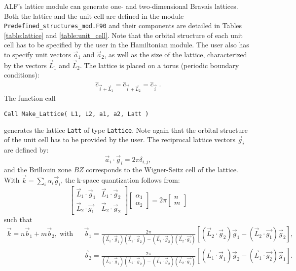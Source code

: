 ALF's lattice module can generate one- and two-dimensional Bravais lattices.
Both the lattice and the unit cell are defined in the module \texttt{Predefined\_structures\_mod.F90} and their components are detailed in Tables \ref{table:lattice} and \ref{table:unit_cell}.
Note that the orbital structure of each unit cell has to be specified by the user in the Hamiltonian module. 
The user also has to specify unit vectors $\vec{a}_1$ and $\vec{a}_2$, as well as the size of the  lattice, characterized by the vectors $\vec{L}_1$ and $\vec{L}_2$. The lattice is placed on a torus (periodic boundary conditions):
\begin{align}
	\hat{c}_{\vec{i} + \vec{L}_1 }  = \hat{c}_{\vec{i} + \vec{L}_2 }  = \hat{c}_{\vec{i}}\;.
\end{align}
The function call 
\lstset{style=fortran}
\begin{lstlisting} 
Call Make_Lattice( L1, L2, a1, a2, Latt )
\end{lstlisting}
generates the lattice \texttt{Latt} of type \texttt{Lattice}.   Note again that  the orbital structure of the unit cell has to be provided by the user.    The reciprocal lattice vectors $\vec{g}_i$ are defined by: 
\begin{equation}
\label{Latt.G.eq}
	\vec{a}_i  \cdot \vec{g}_i = 2 \pi \delta_{i,j}, 
\end{equation}
and the Brillouin zone $BZ$ corresponds to the Wigner-Seitz cell of the lattice. 
With $\vec{k} = \sum_{i} \alpha_i  \vec{g}_i $, the  k-space quantization follows from: 
\begin{equation}
\begin{bmatrix}
	\vec{L}_1 \cdot \vec{g}_1  &  \vec{L}_1 \cdot \vec{g}_2  \\
	\vec{L}_2  \cdot \vec{g_1} & \vec{L}_2 \cdot  \vec{g}_2  
\end{bmatrix}
\begin{bmatrix}
   \alpha_1 \\
   \alpha_2
\end{bmatrix}
=  2 \pi 
\begin{bmatrix}
   n \\
   m
\end{bmatrix}
\end{equation}
such that 
\begin{eqnarray}
\label{k.quant.eq}
     \vec{k} =  n \vec{b}_1  + m \vec{b}_2,\; \text{with}   & &   \vec{b}_1 = \frac{2 \pi}{ (\vec{L}_1 \cdot \vec{g}_1)  (\vec{L}_2 \cdot  \vec{g}_2 )  - (\vec{L}_1 \cdot \vec{g}_2) (\vec{L}_2  \cdot \vec{g_1} ) }   \left[  (\vec{L}_2 \cdot  \vec{g}_2) \vec{g}_1 -   (\vec{L}_2  \cdot \vec{g_1} ) \vec{g}_2 \right], \nonumber \\ 
        & & \vec{b}_2 = \frac{2 \pi}{ (\vec{L}_1 \cdot \vec{g}_1)  (\vec{L}_2 \cdot  \vec{g}_2 )  - (\vec{L}_1 \cdot \vec{g}_2) (\vec{L}_2  \cdot \vec{g_1} ) }   
           \left[  (\vec{L}_1 \cdot  \vec{g}_1) \vec{g}_2 -   (\vec{L}_1  \cdot \vec{g_2} ) \vec{g}_1 \right].
\end{eqnarray}

